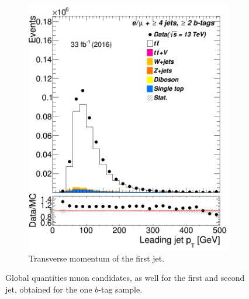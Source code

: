 \begin{figure}
\begin{subfigure}{0.25\textwidth}
	\includegraphics[width=\linewidth]{ControlPlots_emujets_2016_4incl_2incl/jet0_pt_emujets_2016.png}
	\caption{Transverse momentum of the first jet.} \label{fig:a3}
\end{subfigure}

		\caption{Global quantities  muon candidates, as well for the first and second jet, obtained for the one $b$-tag sample.}
\end{figure}





